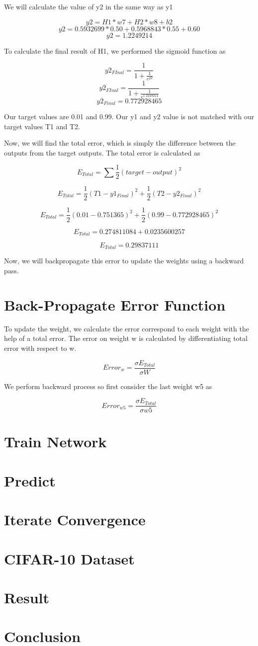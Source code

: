 \documentclass[12pt]{article}
\begin{document}
We will calculate the value of y2 in the same way as y1

\[y2=H1*w7+H2*w8+b2\]
\[y2=0.5932699*0.50+0.5968843*0.55+0.60\]
\[y2=1.2249214\]

To calculate the final result of H1, we performed the sigmoid function as

\[y2_{FInal}=\frac{1}{1+\frac{1}{e^{y2}}}\]
\[y2_{FInal}=\frac{1}{1+\frac{1}{e^{1.2249214}}}\]
\[y2_{Final}=0.772928465\]

Our target values are 0.01 and 0.99. Our y1 and y2 value is not matched with our target values T1 and T2.

Now, we will find the total error, which is simply the difference between the outputs from the target outputs. The total error is calculated as

\[E_{Total}=\sum\frac{1}{2}(target - output)^{2}\]

\[E_{Total}=\frac{1}{2}(T1 - y1_{Final})^{2}+\frac{1}{2}(T2 - y2_{Final})^{2}\]

\[E_{Total}=\frac{1}{2}(0.01 - 0.751365)^{2}+\frac{1}{2}(0.99 - 0.772928465)^{2}\]

\[E_{Total}=0.274811084+0.0235600257\]

\[E_{Total}=0.29837111\]

Now, we will backpropagate this error to update the weights using a backward pass.

\section{Back-Propagate Error Function}
To update the weight, we calculate the error correspond to each weight with the help of a total error. The error on weight w is calculated by differentiating total error with respect to w.

\[Error_{w}=\frac{\sigma E_{Total}}{\sigma W}\]

We perform backward process so first consider the last weight w5 as

\[Error_{w5}=\frac{\sigma E_{Total}}{\sigma w5}\]






\section{Train Network}
\section{Predict}
\section{Iterate Convergence}


\section{CIFAR-10 Dataset}
\section{Result}
\section{Conclusion}




\end{document}
